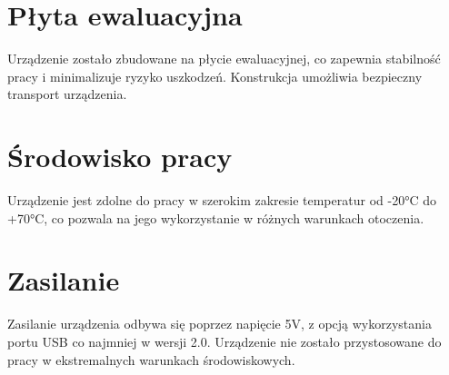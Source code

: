 \vspace{12pt}

\section*{Płyta ewaluacyjna}

Urządzenie zostało zbudowane na płycie ewaluacyjnej, co zapewnia stabilność pracy i minimalizuje ryzyko uszkodzeń. Konstrukcja umożliwia bezpieczny transport urządzenia.


\section*{Środowisko pracy}

Urządzenie jest zdolne do pracy w szerokim zakresie temperatur od -20°C do +70°C, co pozwala na jego wykorzystanie w różnych warunkach otoczenia. %

\section*{Zasilanie}

Zasilanie urządzenia odbywa się poprzez napięcie 5V, z opcją wykorzystania portu USB co najmniej w wersji 2.0. Urządzenie nie zostało przystosowane do pracy w ekstremalnych warunkach środowiskowych.
